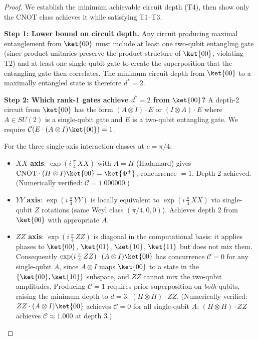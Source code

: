\begin{proof}
We establish the minimum achievable circuit depth (T4), then show
only the CNOT class achieves it while satisfying T1--T3.

\medskip
\noindent\textbf{Step 1: Lower bound on circuit depth.}
Any circuit producing maximal entanglement from $\ket{00}$ must
include at least one two-qubit entangling gate (since product
unitaries preserve the product structure of $\ket{00}$, violating T2)
and at least one single-qubit gate to create the superposition that
the entangling gate then correlates. The minimum circuit depth from
$\ket{00}$ to a maximally entangled state is therefore $d^* = 2$.

\medskip
\noindent\textbf{Step 2: Which rank-1 gates achieve $d^* = 2$ from $\ket{00}$?}
A depth-2 circuit from $\ket{00}$ has the form
$(A \otimes I) \cdot E$ or $(I \otimes A) \cdot E$ where $A \in SU(2)$
is a single-qubit gate and $E$ is a two-qubit entangling gate.
We require $\mathcal{C}(E\cdot(A\otimes I)\ket{00}) = 1$.

For the three single-axis interaction classes at $c = \pi/4$:

\begin{itemize}

\item \textbf{$XX$ axis}: $\exp(i\,\frac{\pi}{4}\,XX)$ with $A = H$
  (Hadamard) gives $\mathrm{CNOT}\cdot(H\otimes I)\ket{00} = \ket{\Phi^+}$,
  concurrence $= 1$. Depth 2 achieved. (Numerically verified:
  $\mathcal{C} = 1.000000$.)

\item \textbf{$YY$ axis}: $\exp(i\,\frac{\pi}{4}\,YY)$ is locally
  equivalent to $\exp(i\,\frac{\pi}{4}\,XX)$ via single-qubit $Z$
  rotations (same Weyl class $(\pi/4,0,0)$). Achieves depth 2
  from $\ket{00}$ with appropriate $A$.

\item \textbf{$ZZ$ axis}: $\exp(i\,\frac{\pi}{4}\,ZZ)$ is diagonal
  in the computational basis: it applies phases to $\ket{00}$,
  $\ket{01}$, $\ket{10}$, $\ket{11}$ but does not mix them.
  Consequently $\exp(i\,\frac{\pi}{4}\,ZZ)\cdot(A\otimes I)\ket{00}$
  has concurrence $\mathcal{C} = 0$ for any single-qubit $A$,
  since $A\otimes I$ maps $\ket{00}$ to a state in the
  $\{\ket{00}, \ket{10}\}$ subspace, and $ZZ$ cannot mix
  the two-qubit amplitudes. Producing $\mathcal{C}=1$
  requires prior superposition on \emph{both} qubits,
  raising the minimum depth to $d = 3$: $(H\otimes H) \cdot ZZ$.
  (Numerically verified: $ZZ\cdot(A\otimes I)\ket{00}$ achieves
  $\mathcal{C}=0$ for all single-qubit $A$; $(H\otimes H)\cdot ZZ$
  achieves $\mathcal{C} \approx 1.000$ at depth 3.)


\end{itemize}
\end{proof}
